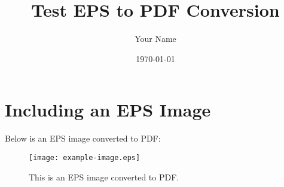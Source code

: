 \documentclass{article}
\begin{document}
\title{Test EPS to PDF Conversion}
\author{Your Name}
\date{\today}
\maketitle

\section{Including an EPS Image}

Below is an EPS image converted to PDF:
\begin{figure}[h!]
    \centering
    \texttt{[image: example-image.eps]}  %
    \caption{This is an EPS image converted to PDF.}
\end{figure}
\end{document}
